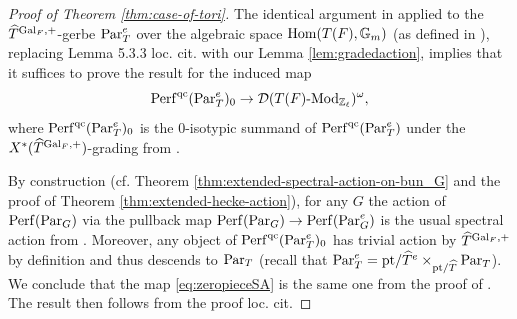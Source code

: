 \begin{proof}[Proof of Theorem \ref{thm:case-of-tori}]
The identical argument in \cite[Lemma 6.2.5]{Zou24} applied to the $\widehat{T}^{\mathrm{Gal}_{F},+}$-gerbe $\mathrm{Par}_{T}^{e}$ over the algebraic space $\mathrm{Hom}(T(F),\mathbb{G}_{m})$ (as defined in \cite[Lemma 4.1.2]{Zou24}), replacing Lemma 5.3.3 loc. cit. with our Lemma \ref{lem:gradedaction}, implies that it suffices to prove the result for the induced map
\begin{equation}\label{eq:zeropieceSA}
    \mathrm{Perf}^{\textnormal{qc}}(\mathrm{Par}_{T}^{e})_{0} \to \mathcal{D}(T(F)\textnormal{-$\textnormal{Mod}_{\mathbb{Z}_{\ell}}$})^{\omega},
\end{equation}
where $\mathrm{Perf}^{\textnormal{qc}}(\mathrm{Par}_{T}^{e})_{0}$ is the $0$-isotypic summand of $\mathrm{Perf}^{\textnormal{qc}}(\mathrm{Par}_{T}^{e})$ under the $X^{*}(\widehat{T}^{\mathrm{Gal}_{F},+})$-grading from \cite[Lemma 4.3.2]{Zou24}.

By construction (cf. Theorem \ref{thm:extended-spectral-action-on-bun_G} and the proof of Theorem \ref{thm:extended-hecke-action}), for any $G$ the action of $\mathrm{Perf}(\mathrm{Par}_{G})$ via the pullback map $\mathrm{Perf}(\mathrm{Par}_{G}) \to \mathrm{Perf}(\mathrm{Par}_{G}^{e})$ is the usual spectral action from \cite{Geometrization}. Moreover, any object of $\mathrm{Perf}^{\textnormal{qc}}(\mathrm{Par}_{T}^{e})_{0}$ has trivial action by $\widehat{T}^{\mathrm{Gal}_{F},+}$ by definition and thus descends to $\mathrm{Par}_{T}$ (recall that $\mathrm{Par}_{T}^{e} = \mathrm{pt}/\widehat{T}^{e} \times_{\mathrm{pt}/\widehat{T}} \mathrm{Par}_{T}$). We conclude that the map \eqref{eq:zeropieceSA} is the same one from the proof of \cite[Theorem 6.4.1]{Zou24}. The result then follows from the proof loc. cit.
\end{proof}
